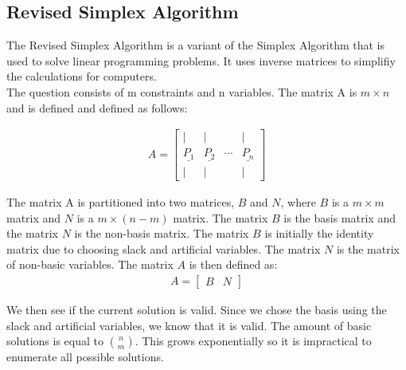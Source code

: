 \documentclass{article}
\numberwithin{equation}{section}
\begin{document}
\subsection{Revised Simplex Algorithm}
The Revised Simplex Algorithm is a variant of the Simplex Algorithm that is used to solve linear programming problems. It uses inverse matrices to simplifiy the calculations for computers. \\

The question consists of m constraints and n variables. The matrix A is $m \times n$ and is defined and defined as follows:

\begin{align}
    A = \begin{bmatrix}
        | & | &   & | \\
        \underline{P_1} & \underline{P_2} & \cdots & \underline{P_n} \\
        | & | &   & |
    \end{bmatrix}
\end{align}

The matrix A is partitioned into two matrices, $B$ and $N$, where $B$ is a $m \times m$ matrix and $N$ is a $m \times (n-m)$ matrix. The matrix $B$ is the basis matrix and the matrix $N$ is the non-basis matrix. The matrix $B$ is initially the identity matrix due to choosing slack and artificial variables. The matrix $N$ is the matrix of non-basic variables. The matrix $A$ is then defined as:
\begin{align}
    A = \begin{bmatrix}
        B & N
    \end{bmatrix}
\end{align}

We then see if the current solution is valid. Since we chose the basis using the slack and artificial variables, we know that it is valid. The amount of basic solutions is equal to $\binom{n}{m}$. This grows exponentially so it is impractical to enumerate all possible solutions.
\end{document}
